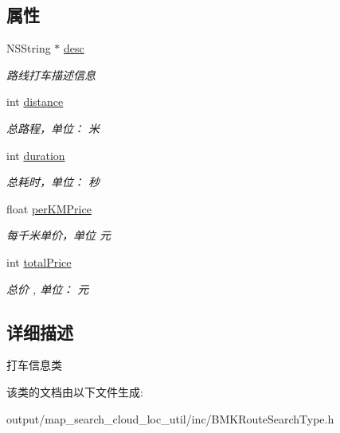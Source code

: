 \subsection*{属性}
\begin{DoxyCompactItemize}
\item 
\hypertarget{interface_b_m_k_taxi_info_a3f7635255548ce4a6baa13c6badc048d}{N\+S\+String $\ast$ \hyperlink{interface_b_m_k_taxi_info_a3f7635255548ce4a6baa13c6badc048d}{desc}}\label{interface_b_m_k_taxi_info_a3f7635255548ce4a6baa13c6badc048d}

\begin{DoxyCompactList}\small\item\em 路线打车描述信息 \end{DoxyCompactList}\item 
\hypertarget{interface_b_m_k_taxi_info_a0f40d0e207438cb15746b8f5c15dd0c7}{int \hyperlink{interface_b_m_k_taxi_info_a0f40d0e207438cb15746b8f5c15dd0c7}{distance}}\label{interface_b_m_k_taxi_info_a0f40d0e207438cb15746b8f5c15dd0c7}

\begin{DoxyCompactList}\small\item\em 总路程，单位： 米 \end{DoxyCompactList}\item 
\hypertarget{interface_b_m_k_taxi_info_af327eba903b8dd7873f3edffbc329dcc}{int \hyperlink{interface_b_m_k_taxi_info_af327eba903b8dd7873f3edffbc329dcc}{duration}}\label{interface_b_m_k_taxi_info_af327eba903b8dd7873f3edffbc329dcc}

\begin{DoxyCompactList}\small\item\em 总耗时，单位： 秒 \end{DoxyCompactList}\item 
\hypertarget{interface_b_m_k_taxi_info_a64631e889c0a36ccd3fa8c1596a25544}{float \hyperlink{interface_b_m_k_taxi_info_a64631e889c0a36ccd3fa8c1596a25544}{per\+K\+M\+Price}}\label{interface_b_m_k_taxi_info_a64631e889c0a36ccd3fa8c1596a25544}

\begin{DoxyCompactList}\small\item\em 每千米单价，单位 元 \end{DoxyCompactList}\item 
\hypertarget{interface_b_m_k_taxi_info_a4787f76e00a7c1a9cda736bfb9d6bd5e}{int \hyperlink{interface_b_m_k_taxi_info_a4787f76e00a7c1a9cda736bfb9d6bd5e}{total\+Price}}\label{interface_b_m_k_taxi_info_a4787f76e00a7c1a9cda736bfb9d6bd5e}

\begin{DoxyCompactList}\small\item\em 总价 , 单位： 元 \end{DoxyCompactList}\end{DoxyCompactItemize}


\subsection{详细描述}
打车信息类 

该类的文档由以下文件生成\+:\begin{DoxyCompactItemize}
\item 
output/map\+\_\+search\+\_\+cloud\+\_\+loc\+\_\+util/inc/B\+M\+K\+Route\+Search\+Type.\+h\end{DoxyCompactItemize}
